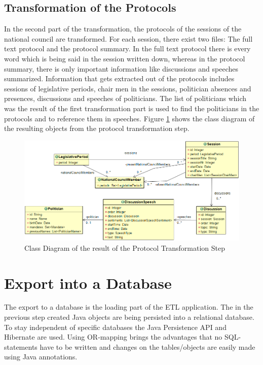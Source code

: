 \subsection{Transformation of the Protocols}
In the second part of the transformation, the protocols of the sessions of the national council are transformed. For each session, there exist two files: The full text protocol and the protocol summary. In the full text protocol there is every word which is being said in the session written down, whereas in the protocol summary, there is only important information like discussions and speeches summarized. Information that gets extracted out of the protocols includes sessions of legislative periods, chair men in the sessions, politician absences and presences, discussions and speeches of politicians. The list of politicians which was the result of the first transformation part is used to find the politicians in the protocols and to reference them in speeches. Figure \ref{fig:session_class_diagram} shows the class diagram of the resulting objects from the protocol transformation step.

\begin{figure}
	\centering
	\includegraphics[width=\textwidth]{imgs/session_class_diagram}
	\caption{Class Diagram of the result of the Protocol Transformation Step}
	\label{fig:session_class_diagram}
\end{figure}


\section{Export into a Database}
\label{sec:export_db}
The export to a database is the loading part of the ETL application. The in the previous step created Java objects are being persisted into a relational database. To stay independent of specific databases the Java Persistence API and Hibernate are used. Using OR-mapping brings the advantages that no SQL-statements have to be written and changes on the tables/objects are easily made using Java annotations.

